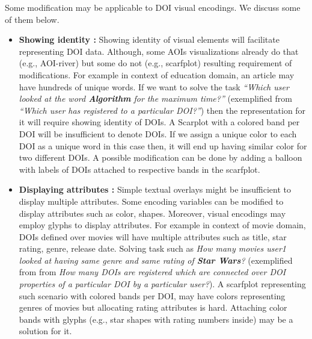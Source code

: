 Some modification may be applicable to DOI visual encodings. We discuss some of them below. 
\begin{itemize}
	\item \textbf{Showing identity :} Showing identity of visual elements will facilitate representing DOI data. Although, some AOIs visualizations already do that (e.g., AOI-river) but some do not (e.g., scarfplot) resulting requirement of modifications. For example in context of education domain, an article may have hundreds of unique words. If we want to solve the task \textit{``Which user looked at the word \textbf{Algorithm} for the maximum time?''} (exemplified from \textit{``Which user has registered to a particular DOI?''}) then the representation for it will require showing identity of DOIs. A Scarplot with a colored band per DOI will be insufficient to denote DOIs. If we assign a unique color to each DOI as a unique word in this case then, it will end up having similar color for two different DOIs. A possible modification can be done by adding a balloon with labels of DOIs attached to respective bands in the scarfplot. 
	\item \textbf{Displaying attributes :} Simple textual overlays might be insufficient to display multiple attributes.  Some encoding variables can be modified to display attributes such as color, shapes. Moreover, visual encodings may employ glyphs to display attributes. For example in context of movie domain, DOIs defined over movies will have multiple attributes such as title, star rating, genre, release date. Solving task such as \textit{How many movies user1 looked at having same genre and same rating of \textbf{Star Wars}?} (exemplified from from \textit{How many DOIs are registered which are connected over DOI properties of a particular DOI by a particular user?}). A scarfplot representing such scenario with colored bands per DOI, may have colors representing genres of movies but allocating rating attributes is hard. Attaching color bands with glyphs (e.g., star shapes with rating numbers inside) may be a solution for it.

\end{itemize}
